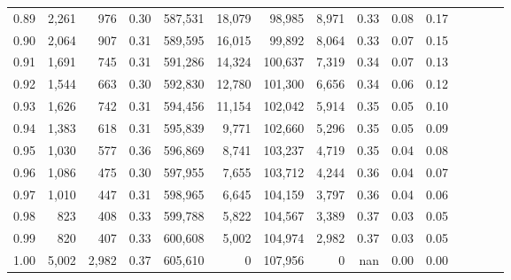 \begin{tabular}{rrrcrrrrrrrrrrr}
0.89 &   2,261 &    976 &                                       0.30 &  587,531 &   18,079 &   98,985 &    8,971 &  0.33 &  0.08 &                         0.17 \\
0.90 &   2,064 &    907 &                                       0.31 &  589,595 &   16,015 &   99,892 &    8,064 &  0.33 &  0.07 &                         0.15 \\
0.91 &   1,691 &    745 &                                       0.31 &  591,286 &   14,324 &  100,637 &    7,319 &  0.34 &  0.07 &                         0.13 \\
0.92 &   1,544 &    663 &                                       0.30 &  592,830 &   12,780 &  101,300 &    6,656 &  0.34 &  0.06 &                         0.12 \\
0.93 &   1,626 &    742 &                                       0.31 &  594,456 &   11,154 &  102,042 &    5,914 &  0.35 &  0.05 &                         0.10 \\
0.94 &   1,383 &    618 &                                       0.31 &  595,839 &    9,771 &  102,660 &    5,296 &  0.35 &  0.05 &                         0.09 \\
0.95 &   1,030 &    577 &                                       0.36 &  596,869 &    8,741 &  103,237 &    4,719 &  0.35 &  0.04 &                         0.08 \\
0.96 &   1,086 &    475 &                                       0.30 &  597,955 &    7,655 &  103,712 &    4,244 &  0.36 &  0.04 &                         0.07 \\
0.97 &   1,010 &    447 &                                       0.31 &  598,965 &    6,645 &  104,159 &    3,797 &  0.36 &  0.04 &                         0.06 \\
0.98 &     823 &    408 &                                       0.33 &  599,788 &    5,822 &  104,567 &    3,389 &  0.37 &  0.03 &                         0.05 \\
0.99 &     820 &    407 &                                       0.33 &  600,608 &    5,002 &  104,974 &    2,982 &  0.37 &  0.03 &                         0.05 \\
1.00 &   5,002 &  2,982 &                                       0.37 &  605,610 &        0 &  107,956 &        0 &   nan &  0.00 &                         0.00 \\
\bottomrule
\end{tabular}
